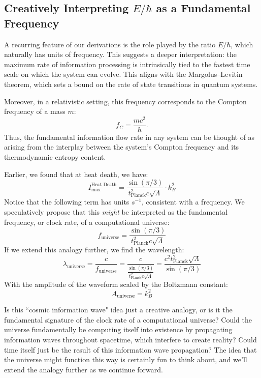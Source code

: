 \documentclass[12pt]{article}
\begin{document}
\subsection{Creatively Interpreting \(E / \hbar\) as a Fundamental Frequency}

A recurring feature of our derivations is the role played by the ratio \(E / \hbar\), which naturally has units of frequency. This suggests a deeper interpretation: the maximum rate of information processing is intrinsically tied to the fastest time scale on which the system can evolve. This aligns with the Margolus–Levitin theorem, which sets a bound on the rate of state transitions in quantum systems.

Moreover, in a relativistic setting, this frequency corresponds to the Compton frequency of a mass \(m\):
\begin{equation}
    f_C = \frac{m c^2}{h}.
\end{equation}
Thus, the fundamental information flow rate in any system can be thought of as arising from the interplay between the system’s Compton frequency and its thermodynamic entropy content.

Earlier, we found that at heat death, we have:
\begin{equation}
    I_\text{max}^{\text{Heat Death}} = \frac{\sin(\pi / 3)}{t_\text{Planck}^2 c \sqrt{\Lambda}} \cdot k_B^2
\end{equation}
Notice that the following term has units $s^{-1}$, consistent with a frequency. We speculatively propose that this \textit{might} be interpreted as the fundamental frequency, or clock rate, of a computational universe:
\begin{equation}
    f_\text{universe} = \frac{\sin(\pi / 3)}{t_\text{Planck}^2 c \sqrt{\Lambda}} 
\end{equation}
If we extend this analogy further, we find the wavelength:
\begin{equation}
    \lambda_\text{universe} = \frac{c}{f_\text{universe}} = \frac{c}{\frac{\sin(\pi / 3)}{t_\text{Planck}^2 c \sqrt{\Lambda}}} = \frac{c^2 t_\text{Planck}^2 \sqrt{\Lambda}}{\sin(\pi / 3)}
\end{equation}
With the amplitude of the waveform scaled by the Boltzmann constant:
\begin{equation}
    A_\text{universe} = k_B^2
\end{equation}

Is this ``cosmic information wave" idea just a creative analogy, or is it the fundamental signature of the clock rate of a computational universe? Could the universe fundamentally be computing itself into existence by propagating information waves throughout spacetime, which interfere to create reality? Could time itself just be the result of this information wave propagation? The idea that the universe might function this way is certainly fun to think about, and we'll extend the analogy further as we continue forward.
\end{document}
